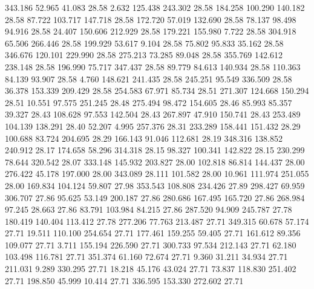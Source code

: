  343.186   52.965   41.083        28.58
   2.632  125.438  243.302        28.58
 184.258  100.290  140.182        28.58
  87.722  103.717  147.718        28.58
 172.720   57.019  132.690        28.58
  78.137   98.498   94.916        28.58
  24.407  150.606  212.929        28.58
 179.221  155.980    7.722        28.58
 304.918   65.506  266.446        28.58
 199.929   53.617    9.104        28.58
  75.802   95.833   35.162        28.58
 346.676  120.101  229.990        28.58
 275.213   73.285   89.048        28.58
 355.769  142.612  238.148        28.58
 196.990   75.717  347.437        28.58
  89.779   84.613  140.934        28.58
 110.363   84.139   93.907        28.58
   4.760  148.621  241.435        28.58
 245.251   95.549  336.509        28.58
  36.378  153.339  209.429        28.58
 254.583   67.971   85.734        28.51
 271.307  124.668  150.294        28.51
  10.551   97.575  251.245        28.48
 275.494   98.472  154.605        28.46
  85.993   85.357   39.327        28.43
 108.628   97.553  142.504        28.43
 267.897   47.910  150.741        28.43
 253.489  104.139  138.291        28.40
  52.207    4.995  257.376        28.31
 233.289  158.441  151.432        28.29
 100.688   83.724  204.695        28.29
 166.143   91.046  112.681        28.19
 348.316  138.852  240.912        28.17
 174.658   58.296  314.318        28.15
  98.327  100.341  142.822        28.15
 230.299   78.644  320.542        28.07
 333.148  145.932  203.827        28.00
 102.818   86.814  144.437        28.00
 276.422   45.178  197.000        28.00
 343.089   28.111  101.582        28.00
  10.961  111.974  251.055        28.00
 169.834  104.124   59.807        27.98
 353.543  108.808  234.426        27.89
 298.427   69.959  306.707        27.86
  95.625   53.149  200.187        27.86
 280.686  167.495  165.720        27.86
 268.984   97.245   28.663        27.86
  83.791  103.984   84.215        27.86
 287.520   94.909  245.787        27.78
 180.419  140.404  113.412        27.78
 277.206   77.763  213.487        27.71
 349.315   60.678   57.174        27.71
  19.511  110.100  254.654        27.71
 177.461  159.255   59.405        27.71
 161.612   89.356  109.077        27.71
   3.711  155.194  226.590        27.71
 300.733   97.534  212.143        27.71
  62.180  103.498  116.781        27.71
 351.374   61.160   72.674        27.71
   9.360   31.211   34.934        27.71
 211.031    9.289  330.295        27.71
  18.218   45.176   43.024        27.71
  73.837  118.830  251.402        27.71
 198.850   45.999   10.414        27.71
 336.595  153.330  272.602        27.71
